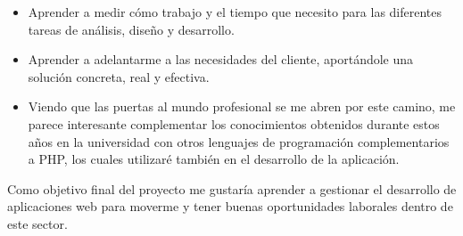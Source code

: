 \begin{itemize}
	\item Aprender a medir cómo trabajo y el tiempo que necesito para las diferentes tareas de análisis, diseño y desarrollo.
	
	\item Aprender a adelantarme a las necesidades del cliente, aportándole una solución concreta, real y efectiva. 
	
	\item Viendo que las puertas al mundo profesional se me abren por este camino, me parece interesante complementar los conocimientos obtenidos durante estos años en la universidad con otros lenguajes de programación complementarios a PHP, los cuales utilizaré también en el desarrollo de la aplicación.
\end{itemize}

Como objetivo final del proyecto me gustaría aprender a gestionar el desarrollo de aplicaciones web para moverme y tener buenas oportunidades laborales dentro de este sector.
